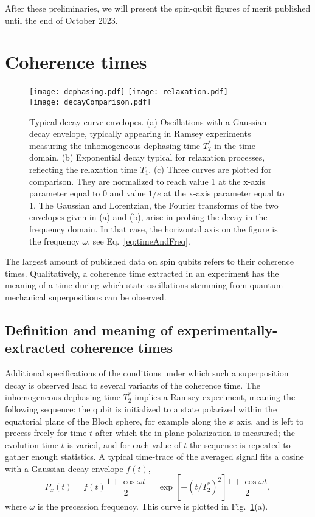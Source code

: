 \documentclass[aps, prx, showpacs, twocolumn, superscriptaddress, notitlepage, longbibliography, floatfix, nofootinbib]{revtex4-2}
\newcommand{\recheck}[1]{{#1}}
\newcommand{\separate}[1]
{
 #1
}
\begin{document}
\separate{
After these preliminaries, we will present the spin-qubit figures of merit published until \recheck{the end of October 2023}.
}

\section{Coherence times}

\label{sec:coherence}

\begin{figure}
\centering
  \texttt{[image: dephasing.pdf]} \hfill
  \texttt{[image: relaxation.pdf]} \hfill\\
  \texttt{[image: decayComparison.pdf]} \hfill
  \caption{\label{fig:envelopes} Typical decay-curve envelopes. (a) Oscillations with a Gaussian decay envelope, typically appearing in Ramsey experiments measuring the inhomogeneous dephasing time $T_2^*$ in the time domain. (b) Exponential decay typical for relaxation processes, reflecting the relaxation time $T_1$. (c) Three curves are plotted for comparison. They are normalized to reach value 1 at the x-axis parameter equal to 0 and value $1/e$ at the x-axis parameter equal to 1. The Gaussian and Lorentzian, the Fourier transforms of the two envelopes given in (a) and (b), arise in probing the decay in the frequency domain. In that case, the horizontal axis on the figure is the frequency $\omega$, see Eq.~\eqref{eq:timeAndFreq}.}
\end{figure}

The largest amount of published data on spin qubits refers to their coherence times. Qualitatively, a coherence time extracted in an experiment has the meaning of a time during which state oscillations stemming from quantum mechanical superpositions can be observed. 

\subsection{Definition and meaning of experimentally-extracted coherence times}

Additional specifications of the conditions under which such a superposition decay is observed lead to several variants of the coherence time. The inhomogeneous dephasing time $T_2^*$ implies a Ramsey experiment, meaning the following sequence: the qubit is initialized to a state polarized within the equatorial plane of the Bloch sphere, for example along the $x$ axis, and is left to precess freely for time $t$ after which the in-plane polarization is measured; the evolution time $t$ is varied, and for each value of $t$ the sequence is repeated to gather enough statistics. A typical time-trace of the averaged signal fits a cosine with a Gaussian decay envelope $f(t)$,
\begin{equation}
P_x(t) = f(t)\frac{1+\cos \omega t}{2} = \exp\left[-(t / T_2^*)^2\right] \frac{1+\cos \omega t}{2},
\label{eq:dephasing}
\end{equation}
where $\omega$ is the precession frequency. This curve is plotted in Fig.~\ref{fig:envelopes}(a). 
\end{document}
